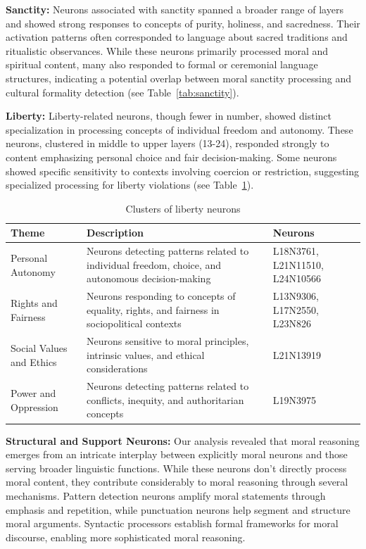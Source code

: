 \documentclass[runninghheads]{llncs}
\begin{document}
\textbf{Sanctity:} Neurons associated with sanctity spanned a broader range of layers and showed strong responses to concepts of purity, holiness, and sacredness. Their activation patterns often corresponded to language about sacred traditions and ritualistic observances. While these neurons primarily processed moral and spiritual content, many also responded to formal or ceremonial language structures, indicating a potential overlap between moral sanctity processing and cultural formality detection (see Table~\ref{tab:sanctity}).



\textbf{Liberty:} Liberty-related neurons, though fewer in number, showed distinct specialization in processing concepts of individual freedom and autonomy. These neurons, clustered in middle to upper layers (13-24), responded strongly to content emphasizing personal choice and fair decision-making. Some neurons showed specific sensitivity to contexts involving coercion or restriction, suggesting specialized processing for liberty violations (see Table~\ref{tab:liberty}).



\begin{table}[!tb]
    \centering
    \begin{tabular}{|>{\raggedright\arraybackslash}p{3cm}|>{\raggedright\arraybackslash}p{5.5cm}|>{\raggedright\arraybackslash}p{3.5cm}|}
    \hline
        \textbf{Theme} & \textbf{Description} & \textbf{Neurons} \\ \hline
        Personal Autonomy & Neurons detecting patterns related to individual freedom, choice, and autonomous decision-making & L18N3761, L21N11510, L24N10566 \\ \hline
        Rights and Fairness & Neurons responding to concepts of equality, rights, and fairness in sociopolitical contexts & L13N9306, L17N2550, L23N826 \\ \hline
        Social Values and Ethics & Neurons sensitive to moral principles, intrinsic values, and ethical considerations & L21N13919 \\ \hline
        Power and Oppression & Neurons detecting patterns related to conflicts, inequity, and authoritarian concepts & L19N3975 \\ \hline
    \end{tabular}
    \caption{Clusters of liberty neurons}
    \label{tab:liberty}
\end{table}




\textbf{Structural and Support Neurons:} Our analysis revealed that moral reasoning emerges from an intricate interplay between explicitly moral neurons and those serving broader linguistic functions. While these neurons don't directly process moral content, they contribute considerably to moral reasoning through several mechanisms. Pattern detection neurons amplify moral statements through emphasis and repetition, while punctuation neurons help segment and structure moral arguments. Syntactic processors establish formal frameworks for moral discourse, enabling more sophisticated moral reasoning.
\end{document}
